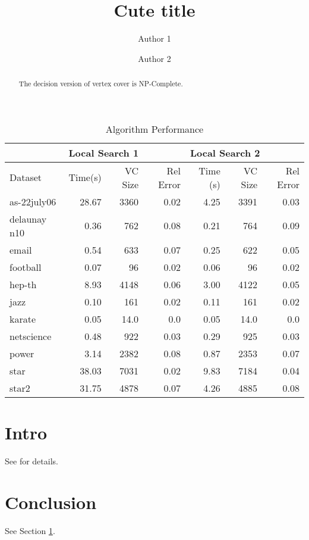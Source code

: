 \documentclass[sigconf]{acmart}
\begin{document}
\title{Cute title}

\author{Author 1}

\author{Author 2}

\begin{abstract}
The decision version of vertex cover is NP-Complete.
\end{abstract}


\maketitle

\begin{table}[]
\centering
\caption{Algorithm Performance}
\label{algperf}
\begin{tabular}{lrrrrrr}
\hline
    & \multicolumn{3}{l}{Local Search 1} & \multicolumn{3}{l}{Local Search 2} \\ \hline
Dataset & Time(s)    & VC Size   & Rel Error  & Time (s)   & VC Size   & Rel Error  \\ \hline
as-22july06    & 28.67   & 3360      & 0.02   & 4.25   & 3391      & 0.03   \\
delaunay n10    & 0.36   & 762      & 0.08   & 0.21   & 764      & 0.09   \\
email    & 0.54   & 633      & 0.07   & 0.25   & 622      & 0.05   \\
football    & 0.07   & 96      & 0.02   & 0.06   & 96      & 0.02   \\
hep-th    & 8.93   & 4148      & 0.06   & 3.00   & 4122      & 0.05   \\
jazz    & 0.10   & 161      & 0.02   & 0.11   & 161      & 0.02   \\
karate    & 0.05   & 14.0      & 0.0   & 0.05   & 14.0      & 0.0   \\
netscience    & 0.48   & 922      & 0.03   & 0.29   & 925      & 0.03   \\
power    & 3.14   & 2382      & 0.08   & 0.87   & 2353      & 0.07   \\
star    & 38.03   & 7031      & 0.02   & 9.83   & 7184      & 0.04   \\
star2    & 31.75   & 4878      & 0.07   & 4.26   & 4885      & 0.08   \\
\end{tabular}
\end{table}
 
\section{Intro} \label{sec:intro}
See \cite{cai2013numvc} for details.

\section{Conclusion}
See Section \ref{sec:intro}.


 
\end{document}
